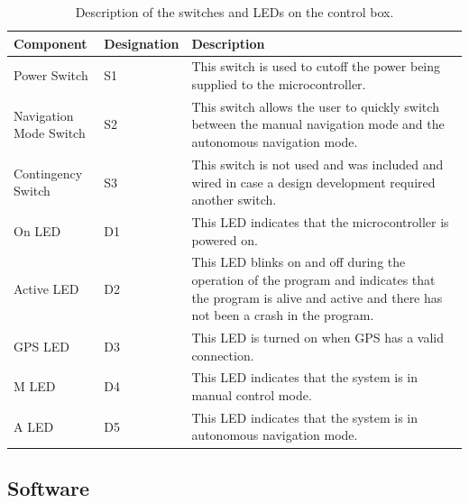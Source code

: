 	\begin{table}[ht]
	\begin{center}
		\caption{Description of the switches and LEDs on the control box.}
		\label{tab:3:controlBx}
		\begin{tabular}{|p{0.2\linewidth} | p{0.15\linewidth}|p{0.65\linewidth}|}
			\hline
			Component & Designation & Description \\
			\hline
			Power Switch & S1 & This switch is used to cutoff the power being supplied to the microcontroller. \\
			\hline
			Navigation Mode Switch & S2 & This switch allows the user to quickly switch between the manual navigation mode and the autonomous navigation mode. \\
			\hline
			Contingency Switch & S3 & This switch is not used and was included and wired in case a design development required another switch. \\
			\hline
			On LED & D1 & This LED indicates that the microcontroller is powered on. \\
			\hline
			Active LED & D2 & This LED blinks on and off during the operation of the program and indicates that the program is alive and active and there has not been a crash in the program. \\
			\hline
			GPS LED & D3 & This LED is turned on when GPS has a valid connection. \\
			\hline 
			M LED & D4 & This LED indicates that the system is in manual control mode. \\
			\hline
			A LED & D5 &  This LED indicates that the system is in autonomous navigation mode. \\
			\hline
		\end{tabular}
	\end{center}
\end{table}
	\subsection{Software}
